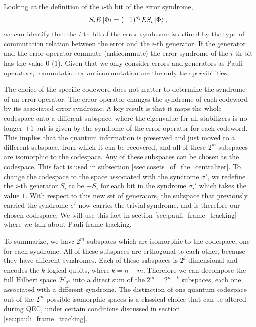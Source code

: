Looking at the definition of the $i$-th bit of the error syndrome, 
\begin{equation}
    S_i E \ket{\Phi} = (-1)^{\tilde{\sigma_i}} E S_i \ket{\Phi},
\end{equation}
we can identify that the $i$-th bit of the error syndrome is defined by the type of commutation relation between the error and the $i$-th generator.
If the generator and the error operator commute (anticommute) the error syndrome of the $i$-th bit has the value $0$ ($1$).
Given that we only consider errors and generators as Pauli operators, commutation or anticommutation are the only two possibilities.

The choice of the specific codeword does not matter to determine the syndrome of an error operator.
The error operator changes the syndrome of each codeword by its associated error syndrome. 
A key result is that it maps the whole codespace onto a different subspace,
where the eigenvalue for all stabilizers is no longer $+1$ but is given by the syndrome of the error operator for each codeword.
This implies that the quantum information is preserved and just moved to a different subspace, from which it can be recovered,
and all of these $2^m$ subspaces are isomorphic to the codespace.
Any of these subspaces can be chosen as the codespace.
This fact is used in subsection \ref{ssec:cosets_of_the_centralizer}.
To change the codespace to the space associated with the syndrome $\sigma'$, we redefine the $i$-th generator $S_i$ to be $-S_i$ 
for each bit in the syndrome ${\sigma_i'}$ which takes the value $1$.
With respect to this new set of generators, the subspace that previously carried the syndrome $\sigma'$ now carries the trivial syndrome, 
and is therefore our chosen codespace.
We will use this fact in section \ref{sec:pauli_frame_tracking} where we talk about Pauli frame tracking.

To summarize, we have $2^m$ subspaces which are isomorphic to the codespace, one for each syndrome. 
All of these subspaces are orthogonal to each other, because they have different syndromes.
Each of these subspaces is $2^k$-dimensional and encodes the $k$ logical qubits, where $k=n-m$.
Therefore we can decompose the full Hilbert space $\mathcal{H}_{2^n}$ into a direct sum of the $2^m=2^{n-k}$ subspaces, each one associated with a different syndrome.
The distinction of one quantum codespace out of the $2^m$ possible isomorphic spaces is a classical choice that can be altered during QEC, 
under certain conditions discussed in section \ref{sec:pauli_frame_tracking}.


